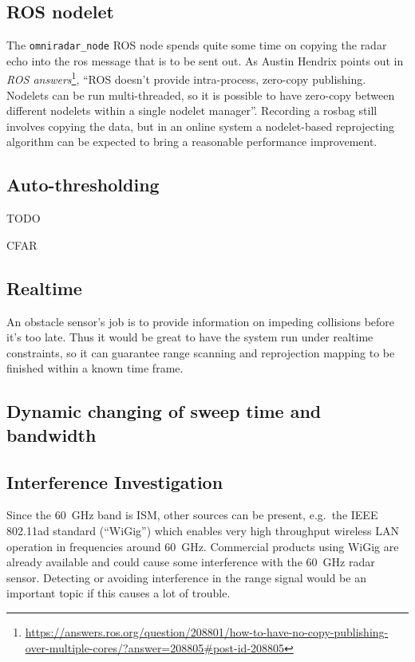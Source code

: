 \subsection{ROS nodelet}\label{ros-nodelet}

The \texttt{omniradar\_node} ROS node spends quite some time on copying
the radar echo into the ros message that is to be sent out. As Austin
Hendrix points out in \textit{ROS answers}\footnote{\url{https://answers.ros.org/question/208801/how-to-have-no-copy-publishing-over-multiple-cores/?answer=208805\#post-id-208805}}, ``ROS doesn't provide intra-process, zero-copy publishing.
Nodelets can be run multi-threaded, so it is possible to have zero-copy
between different nodelets within a single nodelet manager''. Recording
a rosbag still involves copying the data, but in an online system a
nodelet-based reprojecting algorithm can be expected to bring a
reasonable performance improvement.

\subsection{Auto-thresholding}\label{auto-thresholding}

TODO

CFAR

\subsection{Realtime}\label{realtime}

An obstacle sensor's job is to provide information on impeding
collisions before it's too late. Thus it would be great to have the
system run under realtime constraints, so it can guarantee range
scanning and reprojection mapping to be finished within a known time
frame.

\subsection{Dynamic changing of sweep time and bandwidth}\label{dynamic-changing-of-sweep-time-and-bandwidth}

\subsection{Interference Investigation}\label{interference-investigation}

Since the \SI{60}{GHz} band is ISM, other sources can be present, e.g.~the
IEEE 802.11ad standard \cite{IEEE2014} (``WiGig'') which enables very
high throughput wireless LAN operation in frequencies around \SI{60}{GHz}.
Commercial products using WiGig are already available and could cause
some interference with the \SI{60}{GHz} radar sensor. Detecting or avoiding
interference in the range signal would be an important topic if this
causes a lot of trouble.

